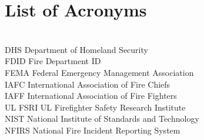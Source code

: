 \documentclass[12pt,oneside]{book}
\begin{document}



\frontmatter

\begin{minipage}[t][9in][s]{6.25in}




\vfill


\titlesigs

\end{minipage}

\frontmatter

\pagestyle{plain}

\newpage

\cleardoublepage
{}
{}
\tableofcontents

\cleardoublepage
{}
{}
\listoffigures

\chapter{List of Acronyms}

\begin{tabbing}
\hspace{1.5in} \= \\

DHS \> Department of Homeland Security \\
FDID \> Fire Department ID \\
FEMA \> Federal Emergency Management Association \\
IAFC \> International Association of Fire Chiefs \\
IAFF \> International Association of Fire Fighters \\
UL FSRI \> UL Firefighter Safety Research Institute \\
NIST \> National Institute of Standards and Technology  \\
NFIRS \> National Fire Incident Reporting System \\
\end{tabbing}
\end{document}
